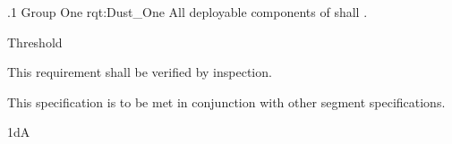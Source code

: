 \ONERQMTVKSA
{\RqtNumberBase.1}
{Group One}
{rqt:Dust_One}
{All deployable components of \ThisSys shall \TBD.}
{
	\item [Phase 1] Threshold
}
{This requirement shall be verified by inspection.}
{
	\item [\cite{ref__BDP_FOS_CDD}] \TBD
}
{
	\item This specification is to be met in conjunction with other segment specifications.
}
{1dA}

